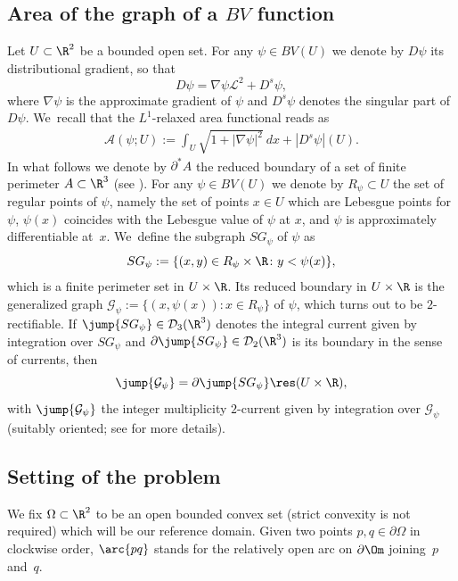 \subsection{Area of the graph of a $BV$ function}
\label{notation}
Let $U\subset \R^2$ be a bounded open set. For any $\psi\in BV(U)$ we
denote by $D\psi$ its distributional gradient, so that
\begin{equation*}
D\psi=\nabla \psi\mathcal{L}^2+D^s\psi,
\end{equation*}
where $\nabla \psi$ is the approximate gradient of $\psi$ and $D^s\psi$ denotes the singular part of $D\psi$. We~recall that the
$L^1$-relaxed area functional reads as \cite{Giusti:84}
\begin{align}\label{def:relaxed_area}
\mathcal A(\psi; U):=\int_U\sqrt{1+|\nabla\psi|^2}~dx+|D^s\psi|(U).
\end{align}
In what follows we denote by $\partial^*A$ the reduced boundary
of a set of finite perimeter $A\subset\R^3$ (see \cite{AFP}).
For any $\psi\in BV(U)$ we denote by $R_\psi\subset U$ the set of regular points of $\psi$, namely the set of points $x\in U$ which are
Lebesgue points for $\psi$, $\psi(x)$
coincides with the
Lebesgue value of $\psi$ at $x$, and $\psi$ is approximately differentiable at~$x$. We~define the subgraph $SG_\psi$ of $\psi$ as
\begin{equation*}
SG_\psi:=\{(x,y)\in R_\psi\times\R\colon y<\psi(x)\},
\end{equation*}
which is a finite perimeter set in $U\times\R$. Its reduced boundary
in $U\times \R$ is the generalized graph $\mathcal G_\psi:=\{(x,\psi(x))\colon x\in R_\psi\}$ of $\psi$,
which turns out to be $2$-rectifiable. If
$\jump{SG_\psi}\in\mathcal D_3(\R^3)$
denotes the integral current given by integration over $SG_\psi$ and
$\partial \jump{SG_\psi}\in\mathcal D_2(\R^3)$ is its boundary in the sense of currents, then
\[
\jump{\mathcal{G}_\psi}=\partial\jump{SG_\psi}\res(U\times\R),
\]
with $\jump{\mathcal{G}_\psi}$ the integer multiplicity $2$-current given by integration over $\mathcal{G}_\psi$ (suitably oriented; see \cite{GiMoSu:98} for more details).

\subsection{Setting of the problem}\label{subsec:setting_of_the_problem}
We fix $\Omega\subset\R^2$ to be an open bounded convex set (strict
convexity is not required) which will be our reference domain. Given two points $p, q \in \partial \Omega$
in clockwise order, $\arc{pq}$ stands for the relatively
open arc on $\partial \Om$ joining~$p$ and~$q$.

